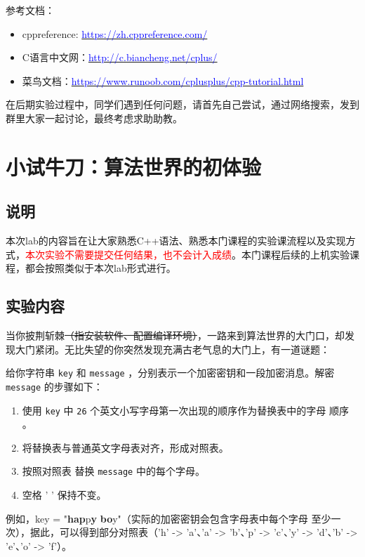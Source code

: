 \documentclass{article}
\begin{document}
\noindent 参考文档：

\begin{itemize}
    \item cppreference: \href{https://zh.cppreference.com/}{\textcolor{blue}{https://zh.cppreference.com/}}
    \item C语言中文网：\href{http://c.biancheng.net/cplus/}{\textcolor{blue}{http://c.biancheng.net/cplus/}}
    \item 菜鸟文档：\href{https://www.runoob.com/cplusplus/cpp-tutorial.html}{\textcolor{blue}{https://www.runoob.com/cplusplus/cpp-tutorial.html}}
\end{itemize}


在后期实验过程中，同学们遇到任何问题，请首先自己尝试，通过网络搜索，发到群里大家一起讨论，最终考虑求助助教。

\section{小试牛刀：算法世界的初体验}
\subsection{说明}
本次lab的内容旨在让大家熟悉C++语法、熟悉本门课程的实验课流程以及实现方式，\textcolor{red}{本次实验不需要提交任何结果，也不会计入成绩}。本门课程后续的上机实验课程，都会按照类似于本次lab形式进行。

\subsection{实验内容}
当你披荆斩棘\sout{（指安装软件、配置编译环境）}，一路来到算法世界的大门口，却发现大门紧闭。无比失望的你突然发现充满古老气息的大门上，有一道谜题：

给你字符串 \texttt{key} 和 \texttt{message} ，分别表示一个加密密钥和一段加密消息。解密 \texttt{message} 的步骤如下：
\begin{enumerate}
    \item 使用 \texttt{key} 中 \texttt{26} 个英文小写字母第一次出现的顺序作为替换表中的字母 顺序 。
    \item 将替换表与普通英文字母表对齐，形成对照表。
    \item 按照对照表 替换 \texttt{message} 中的每个字母。
    \item 空格 ' ' 保持不变。
\end{enumerate}

例如，key = "\textbf{hap}p\textbf{y} \textbf{bo}y"（实际的加密密钥会包含字母表中每个字母 至少一次），据此，可以得到部分对照表（'h' -> 'a'、'a' -> 'b'、'p' -> 'c'、'y' -> 'd'、'b' -> 'e'、'o' -> 'f'）。
\end{document}
